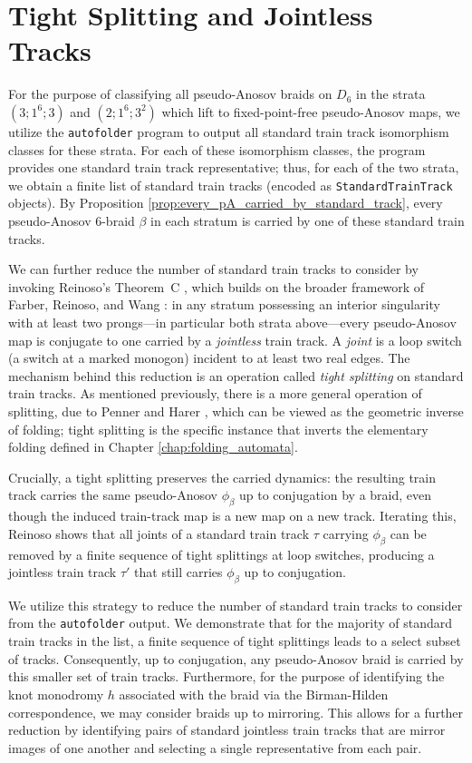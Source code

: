 \chapter{Tight Splitting and Jointless Tracks}
\label{chap:tight_splitting}

For the purpose of classifying all pseudo-Anosov braids on $D_6$ in the strata $(3;1^6;3)$ and $(2;1^6;3^2)$ which lift to fixed-point-free pseudo-Anosov maps, we utilize the \texttt{autofolder} program to output all standard train track isomorphism classes for these strata. For each of these isomorphism classes, the program provides one standard train track representative; thus, for each of the two strata, we obtain a finite list of standard train tracks (encoded as \texttt{StandardTrainTrack} objects). By Proposition \ref{prop:every_pA_carried_by_standard_track}, every pseudo-Anosov 6-braid $\beta$ in each stratum is carried by one of these standard train tracks.

We can further reduce the number of standard train tracks to consider by invoking Reinoso's Theorem~C \cite{reinoso2024pseudo}, which builds on the broader framework of Farber, Reinoso, and Wang \cite{farber2024fixed}: in any stratum possessing an interior singularity with at least two prongs---in particular both strata above---every pseudo-Anosov map is conjugate to one carried by a \emph{jointless} train track. A \emph{joint} is a loop switch (a switch at a marked monogon) incident to at least two real edges. The mechanism behind this reduction is an operation called \emph{tight splitting} on standard train tracks. As mentioned previously, there is a more general operation of splitting, due to Penner and Harer \cite{penner1992combinatorics}, which can be viewed as the geometric inverse of folding; tight splitting is the specific instance that inverts the elementary folding defined in Chapter \ref{chap:folding_automata}.

Crucially, a tight splitting preserves the carried dynamics: the resulting train track carries the same pseudo-Anosov $\phi_\beta$ up to conjugation by a braid, even though the induced train-track map is a new map on a new track. Iterating this, Reinoso shows that all joints of a standard train track $\tau$ carrying $\phi_\beta$ can be removed by a finite sequence of tight splittings at loop switches, producing a jointless train track $\tau'$ that still carries $\phi_\beta$ up to conjugation.

We utilize this strategy to reduce the number of standard train tracks to consider from the \texttt{autofolder} output. We demonstrate that for the majority of standard train tracks in the list, a finite sequence of tight splittings leads to a select subset of tracks. Consequently, up to conjugation, any pseudo-Anosov braid is carried by this smaller set of train tracks. Furthermore, for the purpose of identifying the knot monodromy $h$ associated with the braid via the Birman-Hilden correspondence, we may consider braids up to mirroring. This allows for a further reduction by identifying pairs of standard jointless train tracks that are mirror images of one another and selecting a single representative from each pair.

